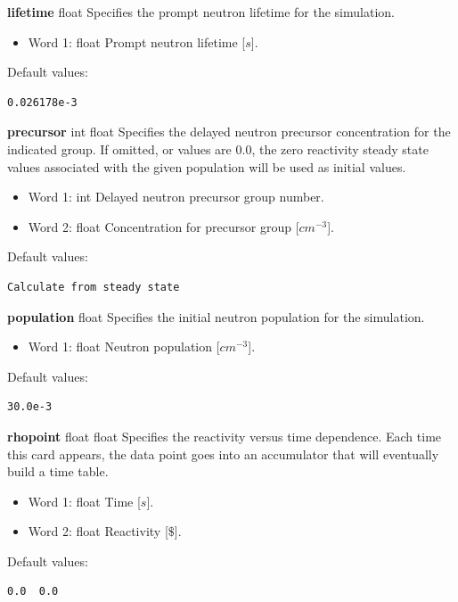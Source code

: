 \documentclass[11pt,letterpaper,titlepage]{article}
\begin{document}
\noindent
\textbf{lifetime} {\color{blue} float} \newline
Specifies the prompt neutron lifetime for the simulation.
\begin{itemize}
	\item Word 1: {\color{blue} float} Prompt neutron lifetime [$s$].
\end{itemize}
Default values:
\begin{verbatim}
0.026178e-3
\end{verbatim}
\vspace {0.5 cm}


\noindent
\textbf{precursor} {\color{blue} int float} \newline
Specifies the delayed neutron precursor concentration for the indicated group. If omitted, or values are $0.0$, the zero reactivity steady state values associated with the given population will be used as initial values.
\begin{itemize}
	\item Word 1: {\color{blue} int} Delayed neutron precursor group number.
	\item Word 2: {\color{blue} float} Concentration for precursor group [$cm^{-3}$].
\end{itemize}
Default values:
\begin{verbatim}
Calculate from steady state
\end{verbatim}
\vspace {0.5 cm}


\noindent
\textbf{population} {\color{blue} float} \newline
Specifies the initial neutron population for the simulation.
\begin{itemize}
	\item Word 1: {\color{blue} float} Neutron population [$cm^{-3}$].
\end{itemize}
Default values:
\begin{verbatim}
30.0e-3
\end{verbatim}
\vspace {0.5 cm}

\newpage
\noindent
\textbf{rhopoint} {\color{blue} float float} \newline
Specifies the reactivity versus time dependence. Each time this card appears, the data point goes into an accumulator that will eventually build a time table.
\begin{itemize}
	\item Word 1: {\color{blue} float} Time [$s$].
	\item Word 2: {\color{blue} float} Reactivity [$\$$].
\end{itemize}
Default values:
\begin{verbatim}
0.0  0.0
\end{verbatim}
\vspace {0.5 cm}
\end{document}
